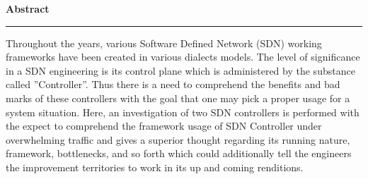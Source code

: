 \setlength{\headsep}{0.4in}
\vspace*{5cm}
\begin{center}

{\bf \LARGE Abstract}

\end{center}

{\noindent \rule{\linewidth}{1mm}} \vspace{0.25in}

\par
Throughout the years, various Software Defined Network (SDN) working frameworks have been created in various dialects models. The level of significance in a SDN engineering is its control plane which is administered by the substance called ''Controller''. Thus there is a need to comprehend the benefits and bad marks of these controllers with the goal that one may pick a proper usage for a system situation. Here, an investigation of two SDN controllers is performed with the expect to comprehend the framework usage of SDN Controller under overwhelming traffic and gives a superior thought regarding its running nature, framework, bottlenecks, and so forth which could additionally tell the engineers the improvement territories to work in its up and coming renditions.
\vspace*{\fill}
\pagebreak